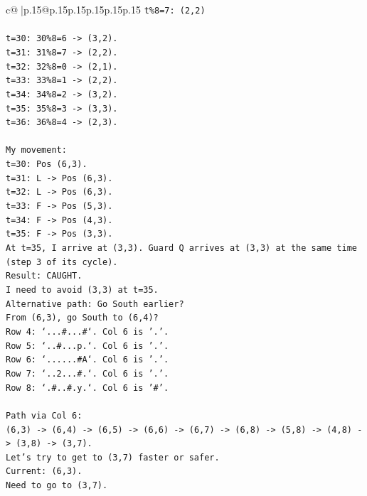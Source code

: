 \documentclass{article}
\begin{document}
{\begin{supertabular}{c@{$\;$}|p{.15\linewidth}@{}p{.15\linewidth}p{.15\linewidth}p{.15\linewidth}p{.15\linewidth}p{.15\linewidth}}
{{{\texttt{t\%8=7: (2,2)} \\
\\ 
\texttt{t=30: 30\%8=6 {-}> (3,2).} \\
\texttt{t=31: 31\%8=7 {-}> (2,2).} \\
\texttt{t=32: 32\%8=0 {-}> (2,1).} \\
\texttt{t=33: 33\%8=1 {-}> (2,2).} \\
\texttt{t=34: 34\%8=2 {-}> (3,2).} \\
\texttt{t=35: 35\%8=3 {-}> (3,3).} \\
\texttt{t=36: 36\%8=4 {-}> (2,3).} \\
\\ 
\texttt{My movement:} \\
\texttt{t=30: Pos (6,3).} \\
\texttt{t=31: L {-}> Pos (6,3).} \\
\texttt{t=32: L {-}> Pos (6,3).} \\
\texttt{t=33: F {-}> Pos (5,3).} \\
\texttt{t=34: F {-}> Pos (4,3).} \\
\texttt{t=35: F {-}> Pos (3,3).} \\
\texttt{At t=35, I arrive at (3,3). Guard Q arrives at (3,3) at the same time (step 3 of its cycle).} \\
\texttt{Result: CAUGHT.} \\
\texttt{I need to avoid (3,3) at t=35.} \\
\texttt{Alternative path: Go South earlier?} \\
\texttt{From (6,3), go South to (6,4)?} \\
\texttt{Row 4: `...\#...\#`. Col 6 is '.'.} \\
\texttt{Row 5: `..\#...p.`. Col 6 is '.'.} \\
\texttt{Row 6: `......\#A`. Col 6 is '.'.} \\
\texttt{Row 7: `..2...\#.`. Col 6 is '.'.} \\
\texttt{Row 8: `.\#..\#.y.`. Col 6 is '\#'.} \\
\\ 
\texttt{Path via Col 6:} \\
\texttt{(6,3) {-}> (6,4) {-}> (6,5) {-}> (6,6) {-}> (6,7) {-}> (6,8) {-}> (5,8) {-}> (4,8) {-}> (3,8) {-}> (3,7).} \\
\texttt{Let's try to get to (3,7) faster or safer.} \\
\texttt{Current: (6,3).} \\
\texttt{Need to go to (3,7).} \\
}}}
\end{supertabular}}
\end{document}
